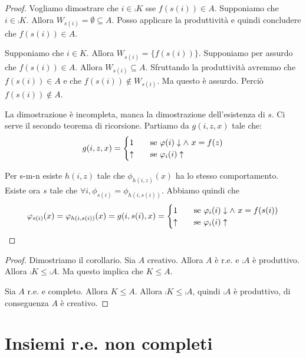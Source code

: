 \begin{proof}
    Vogliamo dimostrare che $i \in \comp{K}$ sse $f(s(i)) \in A$. Supponiamo che $i \in \comp{K}$.
    Allora $W_{s(i)} = \emptyset \subseteq A$. Posso applicare la produttività e quindi concludere
    che $f(s(i)) \in A$.

    Supponiamo che $i \in K$. Allora $W_{s(i)} = \{f(s(i))\}$. Supponiamo per assurdo che $f(s(i)) \in A$.
    Allora $W_{s(i)} \subseteq A$. Sfruttando la produttività avremmo che $f(s(i)) \in A$ e che
    $f(s(i)) \notin W_{s(i)}$. Ma questo è assurdo. Perciò $f(s(i)) \notin A$.

    La dimostrazione è incompleta, manca la dimostrazione dell'esistenza di $s$. Ci serve il secondo
    teorema di ricorsione. Partiamo da $g(i,z,x)$ tale che:
    \begin{equation*}
        g(i,z,x) =
        \begin{cases}
            1 \quad &\text{se $\varphi(i) \downarrow \land$ $x = f(z)$} \\
            \uparrow \quad &\text{se $\varphi_{i}(i) \uparrow$}
        \end{cases}
    \end{equation*}
    
    Per s-m-n esiste $h(i,z)$ tale che $\phi_{h(i,z)}(x)$ ha lo stesso comportamento. Esiste ora $s$ tale che
    $\forall i, \phi_{s(i)} = \phi_{h(i,s(i))}$. Abbiamo quindi che
    \begin{equation*}
        \varphi_{s(i)}(x) = \varphi_{h(i,s(i))}(x) = g(i,s(i),x) =
        \begin{cases}
            1 \quad &\text{se $\varphi_{i}(i) \downarrow \land$ $x = f(s(i))$} \\
            \uparrow \quad &\text{se $\varphi_{i}(i) \uparrow$}
        \end{cases}
    \end{equation*}
\end{proof}

\begin{proof}
    Dimostriamo il corollario. Sia $A$ creativo. Allora $A$ è r.e. e $\comp{A}$ è produttivo. Allora
    $\comp{K} \leq \comp{A}$. Ma questo implica che $K \leq A$.

    Sia $A$ r.e. e completo. Allora $K \leq A$. Allora $\comp{K} \leq \comp{A}$, quindi $\comp{A}$ è
    produttivo, di conseguenza $A$ è creativo.
\end{proof}

\section{Insiemi r.e. non completi}


